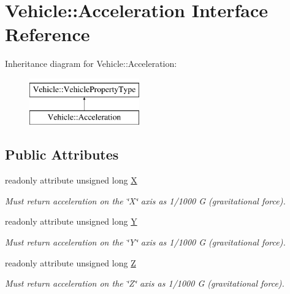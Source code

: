 \hypertarget{interfaceVehicle_1_1Acceleration}{\section{Vehicle\-:\-:Acceleration Interface Reference}
\label{interfaceVehicle_1_1Acceleration}
}
Inheritance diagram for Vehicle\-:\-:Acceleration\-:\begin{figure}[H]
\begin{center}
\leavevmode
\includegraphics[height=2.000000cm]{interfaceVehicle_1_1Acceleration}
\end{center}
\end{figure}
\subsection*{Public Attributes}
\begin{DoxyCompactItemize}
\item 
readonly attribute unsigned long \hyperlink{interfaceVehicle_1_1Acceleration_a78edd942d1c1fadb20b2a527f3a3268a}{X}
\begin{DoxyCompactList}\small\item\em Must return acceleration on the \char`\"{}\-X\char`\"{} axis as 1/1000 G (gravitational force). \end{DoxyCompactList}\item 
readonly attribute unsigned long \hyperlink{interfaceVehicle_1_1Acceleration_a962e62e042a2d28e43ed54ab6d9c70ca}{Y}
\begin{DoxyCompactList}\small\item\em Must return acceleration on the \char`\"{}\-Y\char`\"{} axis as 1/1000 G (gravitational force). \end{DoxyCompactList}\item 
readonly attribute unsigned long \hyperlink{interfaceVehicle_1_1Acceleration_ada14ed01098bb5a2767db58d7ca76d1b}{Z}
\begin{DoxyCompactList}\small\item\em Must return acceleration on the \char`\"{}\-Z\char`\"{} axis as 1/1000 G (gravitational force). \end{DoxyCompactList}\end{DoxyCompactItemize}
